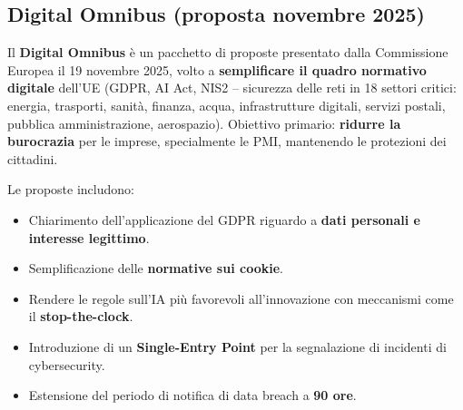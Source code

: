 \documentclass[a4paper,11pt]{article}
\begin{document}
\subsection{Digital Omnibus (proposta novembre 2025)}

Il \textbf{Digital Omnibus} \`{e} un pacchetto di proposte presentato dalla Commissione Europea il 19 novembre 2025, volto a \textbf{semplificare il quadro normativo digitale} dell'UE (GDPR, AI Act, NIS2 -- sicurezza delle reti in 18 settori critici: energia, trasporti, sanit\`{a}, finanza, acqua, infrastrutture digitali, servizi postali, pubblica amministrazione, aerospazio). Obiettivo primario: \textbf{ridurre la burocrazia} per le imprese, specialmente le PMI, mantenendo le protezioni dei cittadini.

Le proposte includono:
\begin{itemize}
  \item Chiarimento dell'applicazione del GDPR riguardo a \textbf{dati personali e interesse legittimo}.
  \item Semplificazione delle \textbf{normative sui cookie}.
  \item Rendere le regole sull'IA pi\`{u} favorevoli all'innovazione con meccanismi come il \textbf{stop-the-clock}.
  \item Introduzione di un \textbf{Single-Entry Point} per la segnalazione di incidenti di cybersecurity.
  \item Estensione del periodo di notifica di data breach a \textbf{90 ore}.
\end{itemize}
\end{document}
